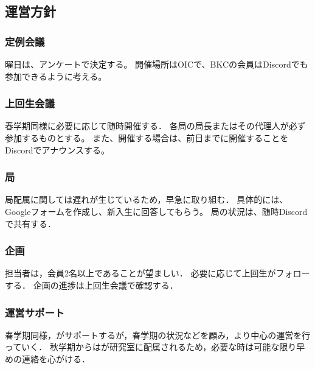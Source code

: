 \subsection*{運営方針}


\subsubsection*{定例会議}
曜日は、アンケートで決定する。
開催場所はOICで、BKCの会員はDiscordでも参加できるように考える。

\subsubsection*{上回生会議}
春学期同様に必要に応じて随時開催する．
各局の局長またはその代理人が必ず参加するものとする。
また、開催する場合は、前日までに開催することをDiscordでアナウンスする。


\subsubsection*{局}
局配属に関しては遅れが生じているため，早急に取り組む．
具体的には、Googleフォームを作成し、新入生に回答してもらう。
局の状況は、随時Discordで共有する．


\subsubsection*{企画}
担当者は，会員2名以上であることが望ましい．
必要に応じて上回生がフォローする．
企画の進捗は上回生会議で確認する．

\subsubsection*{運営サポート}
春学期同様，\thirdGrade{}がサポートするが，春学期の状況などを顧み，より\secondGrade{}中心の運営を行っていく．
秋学期からは\thirdGrade{}が研究室に配属されるため，必要な時は可能な限り早めの連絡を心がける．
